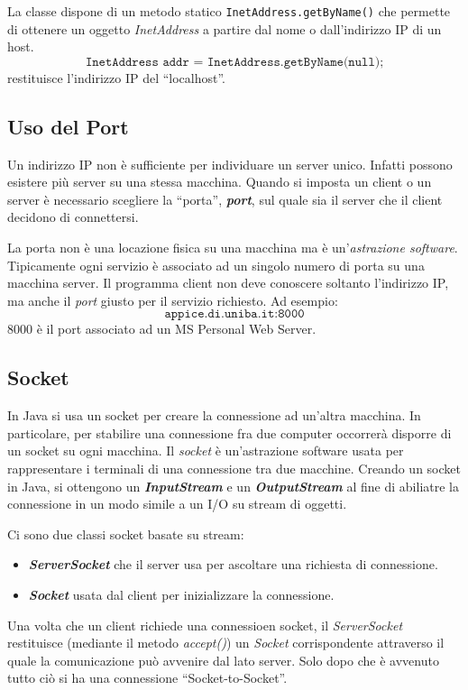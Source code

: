 \documentclass[12pt]{report}
\begin{document}
La classe dispone di un metodo statico \texttt{InetAddress.getByName()} che permette di ottenere un oggetto \textit{InetAddress} a partire dal nome o dall'indirizzo IP di un host.
\[
\texttt{InetAddress addr = InetAddress.getByName(null);}
\]
restituisce l'indirizzo IP del ``localhost''.
\subsection{Uso del Port}
Un indirizzo IP non è sufficiente per individuare un server unico. Infatti possono esistere più server su una stessa macchina. Quando si imposta un client o un server è necessario scegliere la ``porta'', \textbf{\textit{port}}, sul quale sia il server che il client decidono di connettersi.

La porta non è una locazione fisica su una macchina ma è un'\textit{astrazione software}. Tipicamente ogni servizio è associato ad un singolo numero di porta su una macchina server. Il programma client non deve conoscere soltanto l'indirizzo IP, ma anche il \textit{port} giusto per il servizio richiesto. Ad esempio:
\[
\texttt{appice.di.uniba.it:8000}
\]
8000 è il port associato ad un MS Personal Web Server.
\subsection{Socket}
In Java si usa un socket per creare la connessione ad un'altra macchina. In particolare, per stabilire una connessione fra due computer occorrerà disporre di un socket su ogni macchina. Il \textit{socket} è un'astrazione software usata per rappresentare i terminali di una connessione tra due macchine. Creando un socket in Java, si ottengono un \textbf{\textit{InputStream}} e un \textbf{\textit{OutputStream}} al fine di abiliatre la connessione in un modo simile a un I/O su stream di oggetti.

Ci sono due classi socket basate su stream:
\begin{itemize}
	\item \textbf{\textit{ServerSocket}} che il server usa per ascoltare una richiesta di connessione.
	\item \textbf{\textit{Socket}} usata dal client per inizializzare la connessione.
\end{itemize}
Una volta che un client richiede una connessioen socket, il \textit{ServerSocket} restituisce (mediante il metodo \textit{accept()}) un \textit{Socket} corrispondente attraverso il quale la comunicazione può avvenire dal lato server. Solo dopo che è avvenuto tutto ciò si ha una connessione ``Socket-to-Socket''.
\end{document}
